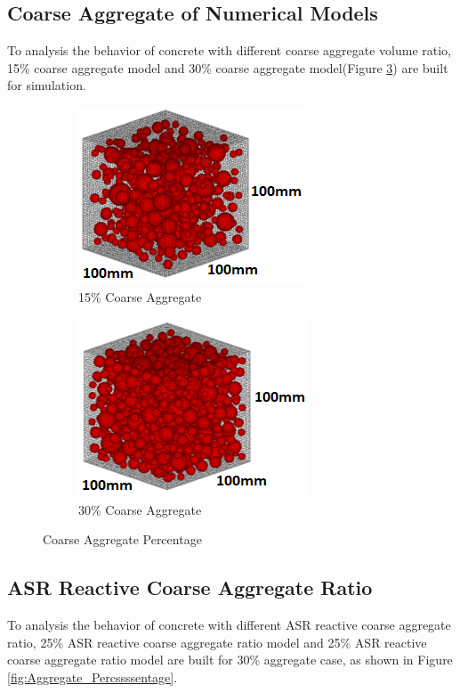 \subsection{Coarse Aggregate of Numerical Models}

To analysis the behavior of concrete with different coarse aggregate volume ratio, 15\% coarse aggregate model and 30\% coarse aggregate model(Figure \ref{fig:Aggresgate_Percentage}) are built for simulation.

\begin{figure}[ht!]
\centering
\begin{subfigure}{.5\textwidth}
  \centering
  \includegraphics[width=.4\linewidth]{Files/Aggregate/A15.png}
  \caption{15\% Coarse Aggregate}
  \label{fig:A15_model}
\end{subfigure}%
\begin{subfigure}{.5\textwidth}
  \centering
  \includegraphics[width=.4\linewidth]{Files/Aggregate/A30.png}
  \caption{30\% Coarse Aggregate}
  \label{fig:A30_model}
\end{subfigure}
\caption{Coarse Aggregate Percentage}
\label{fig:Aggresgate_Percentage}
\end{figure}

\subsection{ASR Reactive Coarse Aggregate Ratio}

To analysis the behavior of concrete with different ASR reactive coarse aggregate ratio, 25\% ASR reactive coarse aggregate ratio model and 25\% ASR reactive coarse aggregate ratio model are built for 30\% aggregate case, as shown in Figure \ref{fig:Aggregate_Percssssentage}.

